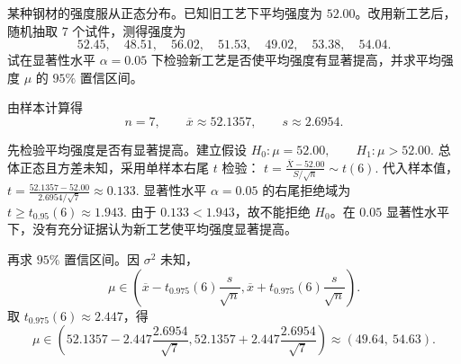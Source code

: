 \documentclass[lang=cn,11pt]{elegantbook}
\begin{document}
\begin{exercise}\label{exer:src-2012-a-07-34credit}
某种钢材的强度服从正态分布。已知旧工艺下平均强度为 \(52.00\)。改用新工艺后，随机抽取 \(7\) 个试件，测得强度为
\[
52.45,\quad 48.51,\quad 56.02,\quad 51.53,\quad
49.02,\quad 53.38,\quad 54.04.
\]
试在显著性水平 \(\alpha=0.05\) 下检验新工艺是否使平均强度有显著提高，并求平均强度 \(\mu\) 的 \(95\%\) 置信区间。
\end{exercise}
\begin{solution}
由样本计算得
\[
n=7,\qquad \overline{x}\approx52.1357,\qquad s\approx2.6954.
\]

先检验平均强度是否有显著提高。建立假设
\(
H_0\colon \mu=52.00,\qquad H_1\colon \mu>52.00.
\)
总体正态且方差未知，采用单样本右尾 \(t\) 检验：
\(
t=\frac{\overline X-52.00}{S/\sqrt n}\sim t(6).
\)
代入样本值，
\(
t=\frac{52.1357-52.00}{2.6954/\sqrt7}\approx0.133.
\)
显著性水平 \(\alpha=0.05\) 的右尾拒绝域为
\(
t\ge t_{0.95}(6)\approx1.943.
\)
由于 \(0.133<1.943\)，故不能拒绝 \(H_0\)。在 \(0.05\) 显著性水平下，没有充分证据认为新工艺使平均强度显著提高。

再求 \(95\%\) 置信区间。因 \(\sigma^2\) 未知，
\[
\mu\in\left(\overline{x}-t_{0.975}(6)\frac{s}{\sqrt n},
\overline{x}+t_{0.975}(6)\frac{s}{\sqrt n}\right).
\]
取 \(t_{0.975}(6)\approx2.447\)，得
\[
\mu\in
\left(52.1357-2.447\frac{2.6954}{\sqrt7},
52.1357+2.447\frac{2.6954}{\sqrt7}\right)
\approx(49.64,\ 54.63).
\]
\end{solution}
\end{document}
